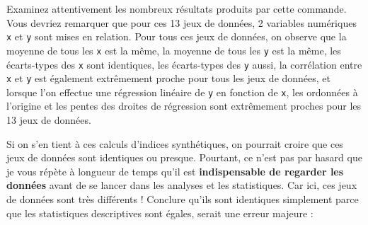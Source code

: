 \documentclass[
  a4paper,
]{article}
\newenvironment{Shaded}{\begin{snugshade}}{\end{snugshade}}
\newcommand{\DataTypeTok}[1]{\textcolor[rgb]{0.00,0.34,0.68}{#1}}
\newcommand{\DecValTok}[1]{\textcolor[rgb]{0.69,0.50,0.00}{#1}}
\newcommand{\KeywordTok}[1]{\textcolor[rgb]{0.12,0.11,0.11}{\textbf{#1}}}
\newcommand{\NormalTok}[1]{\textcolor[rgb]{0.12,0.11,0.11}{#1}}
\newcommand{\OperatorTok}[1]{\textcolor[rgb]{0.12,0.11,0.11}{#1}}
\newcommand{\OtherTok}[1]{\textcolor[rgb]{0.00,0.43,0.16}{#1}}
\newcommand{\StringTok}[1]{\textcolor[rgb]{0.75,0.01,0.01}{#1}}
\begin{document}
\begin{Shaded}
\end{Shaded}

Examinez attentivement les nombreux résultats produits par cette commande. Vous devriez remarquer que pour ces 13 jeux de données, 2 variables numériques \texttt{x} et \texttt{y} sont mises en relation. Pour tous ces jeux de données, on observe que la moyenne de tous les \texttt{x} est la même, la moyenne de tous les \texttt{y} est la même, les écarts-types des \texttt{x} sont identiques, les écarts-types des \texttt{y} aussi, la corrélation entre \texttt{x} et \texttt{y} est également extrêmement proche pour tous les jeux de données, et lorsque l'on effectue une régression linéaire de \texttt{y} en fonction de \texttt{x}, les ordonnées à l'origine et les pentes des droites de régression sont extrêmement proches pour les 13 jeux de données.

Si on s'en tient à ces calculs d'indices synthétiques, on pourrait croire que ces jeux de données sont identiques ou presque. Pourtant, ce n'est pas par hasard que je vous répète à longueur de temps qu'il est \textbf{indispensable de regarder les données} avant de se lancer dans les analyses et les statistiques. Car ici, ces jeux de données sont très différents ! Conclure qu'ils sont identiques simplement parce que les statistiques descriptives sont égales, serait une erreur majeure :

\begin{Shaded}
\end{Shaded}
\end{document}

